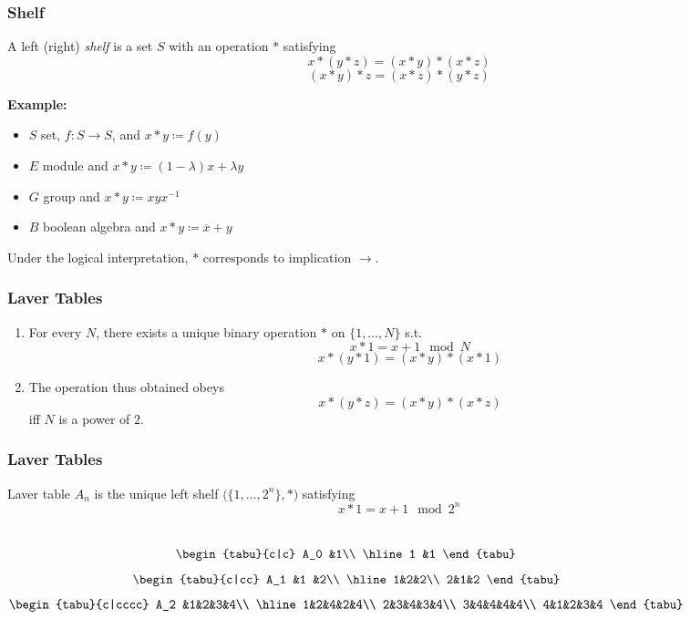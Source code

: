 \documentclass[UTF8,11pt,colorlinks,compress,openany]{beamer}%
\begin{document}
\begin{frame}\frametitle{Shelf}
\setlength\abovedisplayskip{0pt}
\setlength\belowdisplayskip{0pt}
	\begin{definition}[Shelf]
	A left (right) \emph{shelf} is a set $S$ with an operation $*$ satisfying
	\[x*(y*z)=(x*y)*(x*z)\tag{left self-distributive}\]
	\[(x*y)*z=(x*z)*(y*z)\tag{right self-distributive}\]
	\end{definition}
	\textbf{Example:} 
	\begin{itemize}
		\item $S$ set, $f: S\to S$, and $x*y\coloneqq f(y)$
		\item $E$ module and $x*y\coloneqq (1-\lambda)x+\lambda y$
		\item $G$ group and $x*y\coloneqq xyx^{-1}$
		\item $B$ boolean algebra and $x*y\coloneqq \overline{x}+y$
	\end{itemize}
	Under the logical interpretation, $*$ corresponds to implication $\to$.
\end{frame}

\begin{frame}\frametitle{Laver Tables}
	\begin{theorem}[Laver]
	\begin{enumerate}
		\item For every $N$, there exists a unique binary operation $*$ on $\{1,\dots,N\}$ s.t. 
		\[x*1=x+1\mod N\]
		\[x*(y*1)=(x*y)*(x*1)\]
		\item The operation thus obtained obeys
		\[x*(y*z)=(x*y)*(x*z)\]
		iff $N$ is a power of $2$.
	\end{enumerate}
	\end{theorem}
\end{frame}

\begin{frame}\frametitle{Laver Tables}
	\begin{definition}
	Laver table $A_n$ is the unique left shelf $\big(\{1,\dots,2^n\},*\big)$ satisfying
	\[x*1=x+1\mod 2^n\]
	\end{definition}
\begin{columns}
\[
\begin{tabu}{c|c}
A_0 &1\\
\hline
1 &1
\end{tabu}
\]
\[
\begin{tabu}{c|cc}
A_1 &1 &2\\
\hline
1&2&2\\
2&1&2
\end{tabu}
\]
\[
\begin{tabu}{c|cccc}
A_2 &1&2&3&4\\
\hline
1&2&4&2&4\\
2&3&4&3&4\\
3&4&4&4&4\\
4&1&2&3&4
\end{tabu}
\]
\end{columns}\vspace*{7pt}
\centering{}
\end{frame}
\end{document}
